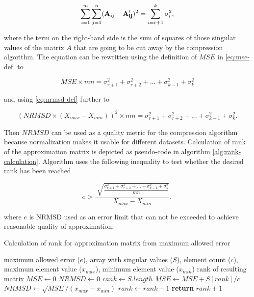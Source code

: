 \begin{equation}
\sum_{i=1}^{m} \sum_{j=1}^{n} (\mathbf{A_{ij}} - \mathbf{A'_{ij}})^{2} = \sum_{i=r+1}^{k}{\sigma_{i}^{2}},
\end{equation}

\noindent
where the term on the right-hand side is the sum of squares of those singular values of the matrix $A$ that are going to be cut away by the compression algorithm. The equation can be rewritten using the definition of $MSE$ in \eqref{eq:mse-def} to

\begin{equation}
MSE \times m n = \sigma_{r+1}^{2} + \sigma_{r+2}^{2} + ... + \sigma_{k-1}^{2} + \sigma_{k}^2
\end{equation}

\noindent
and using \eqref{eq:nrmsd-def} further to

\begin{equation}
(NRMSD \times (X_{max}-X_{min}))^{2} \times m n = \sigma_{r+1}^{2} + \sigma_{r+2}^{2} + ... + \sigma_{k-1}^{2} + \sigma_{k}^2.
\end{equation}

Then $NRMSD$ can be used as a quality metric for the compression algorithm because normalization makes it usable for different datasets. Calculation of rank of the approximation matrix is depicted as pseudo-code in algorithm \ref{alg:rank-calculation}. Algorithm uses the following inequality to test whether the desired rank has been reached

\begin{equation}
e > \frac{\sqrt[]{\frac{\sigma_{r+1}^{2} + \sigma_{r+2}^{2} + ... + \sigma_{k-1}^{2} + \sigma_{k}^2}{m n}}}{X_{max}-X_{min}},
\end{equation}

\noindent
where $e$ is NRMSD used as an error limit that can not be exceeded to achieve reasonable quality of approximation.

\begin{algorithm}
  \caption{Calculation of rank for approximation matrix from maximum allowed error}\label{rankAlgorithm}
  \label{alg:rank-calculation}
  \begin{algorithmic}[1]
  	\INPUT maximum allowed error ($e$), array with singular values ($S$), element count ($c$), maximum element value ($x_{max}$), minimum element value ($x_{min}$)
    \OUTPUT rank of resulting matrix
      \State $MSE \gets 0$
      \State $NRMSD \gets 0$
      \State $rank \gets S.length$
        \State $MSE \gets MSE + S[rank]/c$ 
        \State $NRMSD \gets \sqrt{MSE} / (x_{max} - x_{min})$ 
        \State $rank \gets rank - 1$ 
      \EndWhile
      \State \textbf{return} $rank + 1$ 
    \EndProcedure
  \end{algorithmic}
\end{algorithm}

